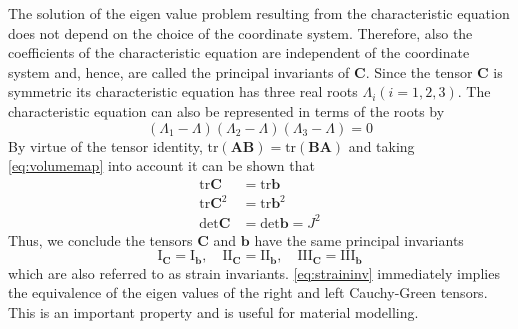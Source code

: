 The solution of the eigen value problem resulting from the characteristic equation does not depend on the choice of the coordinate system. Therefore, also the coefficients of the characteristic equation are independent of the coordinate system and, hence, are called the principal invariants of \(\mathbf{C}\). Since the tensor \(\mathbf{C}\) is symmetric its characteristic equation has three real roots \(\Lambda_{i}(i=1,2,3)\). The characteristic equation can also be represented in terms of the roots by 
\begin{equation}
    (\Lambda_{1} - \Lambda)(\Lambda_{2} - \Lambda)(\Lambda_{3} - \Lambda) = 0
\end{equation}
By virtue of the tensor identity, \(\text{tr}(\mathbf{AB}) = \text{tr}(\mathbf{BA})\) and taking \cref{eq:volumemap} into account it can be shown that
\begin{align}
    \text{tr}\mathbf{C} &= \text{tr}\mathbf{b}\\
    \text{tr}\mathbf{C}^2 &= \text{tr}\mathbf{b}^2\\ 
    \text{det}\mathbf{C} &= \text{det}\mathbf{b} = J^2
\end{align}
Thus, we conclude the tensors \(\mathbf{C}\) and \(\mathbf{b}\) have the same principal invariants
\begin{equation}
    \text{I}_{\mathbf{C}} = \text{I}_{\mathbf{b}}, \quad 
    \text{II}_{\mathbf{C}} = \text{II}_{\mathbf{b}}, \quad
    \text{III}_{\mathbf{C}} = \text{III}_{\mathbf{b}}
    \label{eq:straininv}
\end{equation}
which are also referred to as strain invariants. \cref{eq:straininv} immediately implies the equivalence of the eigen values of the right and left Cauchy-Green tensors. This is an important property and is useful for material modelling.

